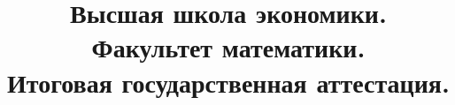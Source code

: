 \documentclass[12pt, a4paper]{article}
\theoremstyle{definition}
\theoremstyle{remark}
\begin{document}
	\title{Высшая школа экономики. Факультет математики.\\Итоговая государственная аттестация.}
	\maketitle
	
	
	
	
	
	
	
	
	
	
	
	
	
	
	
	
	
	
	
	
	
	
	
	
	
	
	
	
	
	
	
	
	
	
	
	
	
	
	
	
	
	
	
	
	
	
	
	
	
	
	
	
	
	
	
	
	
	
	
	
	
	
	
\end{document}
